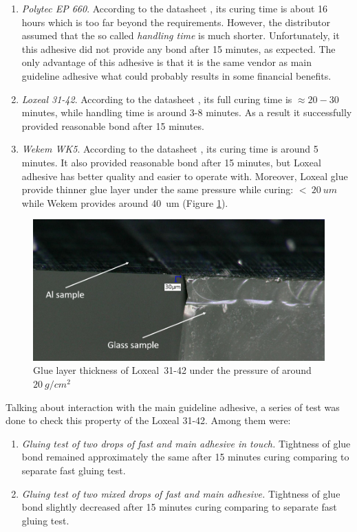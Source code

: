 \begin{enumerate}
\setlength\itemsep{-0.5em}
\item \textit{Polytec EP 660}. According to the datasheet \cite{Polytec_EP_660_datasheet}, its curing time is about 16 hours which is too far beyond the requirements. However, the distributor assumed that the so called \emph{handling time} is much shorter. Unfortunately, it this adhesive did not provide any bond after 15 minutes, as expected. The only advantage of this adhesive is that it is the same vendor as main guideline adhesive what could probably results in some financial benefits.
\item \textit{Loxeal 31-42}. According to the datasheet \cite{Loxeal_31_42_datasheet}, its full curing time is $\approx20-30$~ minutes, while handling time is around 3-8 minutes. As a result it successfully provided reasonable bond after 15 minutes.
\item \textit{Wekem WK5}. According to the datasheet \cite{Wekem_WK_5_datasheet}, its curing time is around 5 minutes. It also provided reasonable bond after 15 minutes, but Loxeal adhesive has better quality and easier to operate with. Moreover, Loxeal glue provide thinner glue layer under the same pressure while curing: $<~20~um$ while Wekem provides around 40~um (Figure \ref{fig:glue_thickness}).
\end{enumerate}

\begin{figure}[ht]\centering
\includegraphics[width=0.7\linewidth]{Data/Module_assembly/Loxeal_393g_point_1.png}
\caption{Glue layer thickness of Loxeal~31-42 under the pressure of around $20~g/cm^{2}$}
\label{fig:glue_thickness}
\end{figure}

Talking about interaction with the main guideline adhesive, a series of test was done to check this property of the Loxeal 31-42. Among them were:

\begin{enumerate}
\setlength\itemsep{-0.5em}
\item \textit{Gluing test of two drops of fast and main adhesive in touch.} Tightness of glue bond remained approximately the same after 15 minutes curing comparing to separate fast gluing test.
\item \textit{Gluing test of two mixed drops of fast and main adhesive.} Tightness of glue bond slightly decreased after 15 minutes curing comparing to separate fast gluing test.
\end{enumerate}

